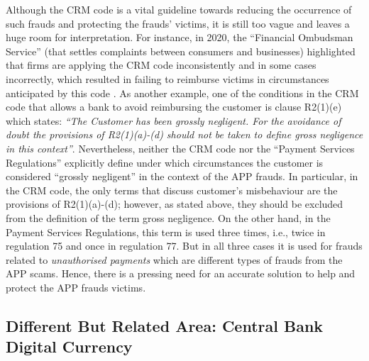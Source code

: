 Although the CRM code is a vital guideline  towards reducing the occurrence of such frauds and protecting  the frauds' victims, it is still too vague and leaves a huge room for interpretation. For instance, in 2020, the ``Financial Ombudsman Service'' (that settles complaints between consumers and businesses)  highlighted that firms  are applying the CRM code inconsistently and in some cases incorrectly, which resulted in failing to reimburse victims in circumstances anticipated by this code \cite{Financial-Ombudsman-Service-response}.  As another example, one of the conditions in the CRM code that allows a bank to avoid reimbursing the customer is clause R2(1)(e) which states: \textit{``The Customer has been grossly negligent. For the avoidance of doubt the provisions of R2(1)(a)-(d) should not be taken to define gross negligence in this context''}.  Nevertheless, neither the CRM code  nor the ``Payment Services Regulations'' \cite{Regulations}   explicitly define under which circumstances the customer is considered ``grossly negligent'' in the context of the APP frauds. In particular, in the CRM code, the only terms that discuss customer's misbehaviour are  the provisions of R2(1)(a)-(d); however, as stated above, they should be excluded from the definition of the term gross negligence. On the  other hand,  in the Payment Services Regulations, this term is used three times, i.e.,  twice in regulation 75 and once in regulation 77. But in all  three cases it is used for frauds related to \emph{unauthorised payments} which are  different types of frauds from the APP scams. Hence, there is a pressing need for an accurate solution to help and protect the APP frauds victims. 

\subsection{Different But Related Area: Central Bank Digital Currency}

